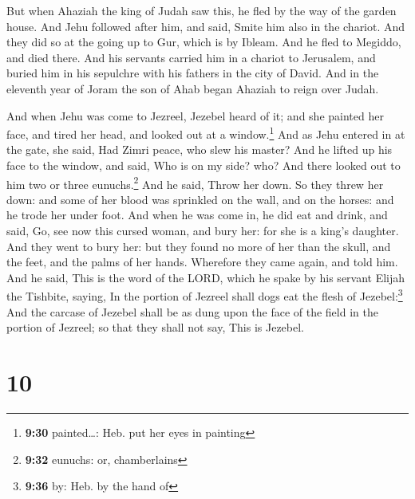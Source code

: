  But when Ahaziah the king of Judah saw this, he fled by
the way of the garden house. And Jehu followed after him, and said,
Smite him also in the chariot. And they did so at the going up to Gur,
which is by Ibleam. And he fled to Megiddo, and died there.
 And his servants carried him in a chariot to Jerusalem,
and buried him in his sepulchre with his fathers in the city of David.
 And in the eleventh year of Joram the son of Ahab began
Ahaziah to reign over Judah.

 And when Jehu was come to Jezreel, Jezebel heard of it;
and she painted her face, and tired her head, and looked out at a
window.\footnote{\textbf{9:30} painted\ldots: Heb. put her eyes in
  painting}  And as Jehu entered in at the gate, she
said, Had Zimri peace, who slew his master?  And he
lifted up his face to the window, and said, Who is on my side? who? And
there looked out to him two or three eunuchs.\footnote{\textbf{9:32}
  eunuchs: or, chamberlains}  And he said, Throw her
down. So they threw her down: and some of her blood was sprinkled on the
wall, and on the horses: and he trode her under foot. 
And when he was come in, he did eat and drink, and said, Go, see now
this cursed woman, and bury her: for she is a king's daughter.
 And they went to bury her: but they found no more of her
than the skull, and the feet, and the palms of her hands.
 Wherefore they came again, and told him. And he said,
This is the word of the LORD, which he spake by his servant Elijah the
Tishbite, saying, In the portion of Jezreel shall dogs eat the flesh of
Jezebel:\footnote{\textbf{9:36} by: Heb. by the hand of} 
And the carcase of Jezebel shall be as dung upon the face of the field
in the portion of Jezreel; so that they shall not say, This is Jezebel.

\hypertarget{section-9}{%
\section{10}\label{section-9}}

